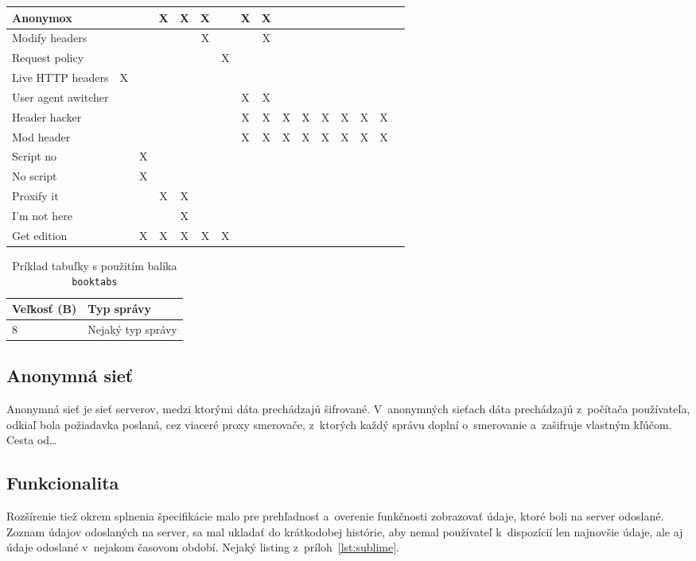 \begin{table}[htbp]
\begin{center}
\begin{tabular}{p{4cm}|c|c|c|c|c|c|c|c|c|c|c|c|c|c|c}
Anonymox &  && X & X & X &  & X & X & & & & & & \\  \hline
Modify headers & & &  &  & X &  &  & X &  &  &  & & &  \\  \hline
Request policy & & &  &  & & X  &  &  &  &  &  & & &   \\  \hline
Live HTTP headers & X& &  &  & &  &  &  &  &  &  & & &   \\  \hline
User agent awitcher & & &  &  & &  & X & X &  &  &  & & &   \\  \hline
Header hacker & & &  &  & &  & X & X & X & X & X & X & X & X    \\  \hline
Mod header & & &  &  & &  & X & X & X & X & X & X & X & X    \\  \hline
Script no & &X &  &  & &  &  &  &  &  &  &  &  &     \\  \hline
No script & &X &  &  & &  &  &  &  &  &  &  &  &     \\  \hline
Proxify it & & &X  & X & &  &  &  &  &  &  &  &  &     \\  \hline
I'm not here & & &  & X & &  &  &  &  &  &  &  &  &     \\  \hline
Get edition & &X &X &X &X&X &  &  &  &  &  &  &  &     \\  \hline
\end{tabular}
\end{center}
\end{table}

\begin{table}[htbp]
    \centering
    \caption{Príklad tabuľky s použitím balíka \texttt{booktabs}}
    \begin{tabular}{@{}ll@{}} \toprule
         Veľkosť (B) & Typ správy \\ \midrule
         8 & Nejaký typ správy \\ \bottomrule
    \end{tabular}
    \label{tab:my_label}
\end{table}

\subsection{Anonymná sieť}
Anonymná sieť je sieť serverov, medzi ktorými dáta prechádzajú šifrované. V~anonymných sieťach dáta prechádzajú z~počítača používateľa, odkiaľ bola požiadavka poslaná, cez viaceré proxy smerovače, z~ktorých každý správu doplní o~smerovanie a~zašifruje vlastným kľúčom. Cesta od\ldots


\subsection{Funkcionalita}
Rozšírenie tiež okrem splnenia špecifikácie malo pre prehľadnosť a~overenie funkčnosti zobrazovať údaje, ktoré boli na server odoslané. Zoznam údajov odoslaných na server, sa mal ukladať do krátkodobej histórie, aby nemal používateľ k~dispozícií len najnovšie údaje, ale aj údaje odoslané v~nejakom časovom období. Nejaký listing z~príloh~\ref{lst:sublime}.


